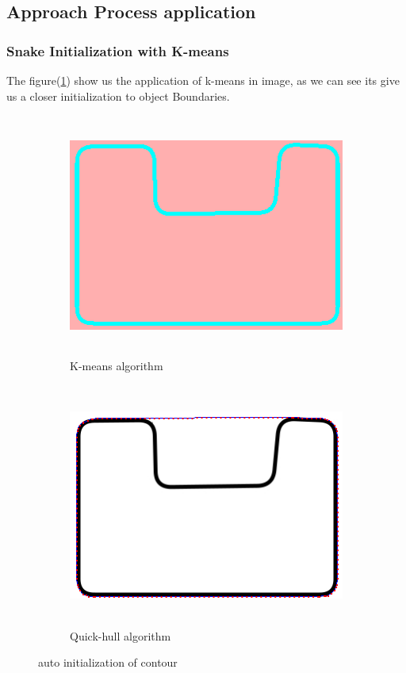 \subsection{Approach Process application}\label{subsec:approach-process-application}
\subsubsection{Snake Initialization with K-means}
The figure(\ref{fig:figure3.6}) show us the application of k-means in image, as we can see its give us a
closer initialization to object Boundaries.

\begin{figure}[ht!]
    \centering
    \begin{subfigure}[b]{1\textwidth}
        \centering
        \includegraphics[width=12cm,height=8cm]{chapiter3/figures/k-means-region.png}
        \caption{K-means algorithm}
    \end{subfigure}
    \hfill
    \begin{subfigure}[b]{1\textwidth}
        \centering
        \includegraphics[width=12cm,height=8cm]{chapiter3/figures/figure 06 initilization using k-means.png}
        \caption{Quick-hull algorithm}
    \end{subfigure}
    \caption{auto initialization of contour}
    \label{fig:figure3.6}
\end{figure}

